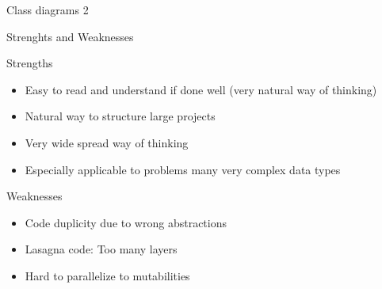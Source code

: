 \begin{frame}{Class diagrams 2}
	
\end{frame}

\begin{frame}{Strenghts and Weaknesses}
	
\begin{block}{Strengths}
	\begin{itemize}
		\item Easy to read and understand if done well (very natural way of thinking)
		\item Natural way to structure large projects
		\item Very wide spread way of thinking
		\item Especially applicable to problems many very complex data types
	\end{itemize}
\end{block}
\begin{block}{Weaknesses}
\begin{itemize}
	\item Code duplicity due to wrong abstractions
	\item Lasagna code: Too many layers 
	\item Hard to parallelize to mutabilities
\end{itemize}
\end{block}
\end{frame}